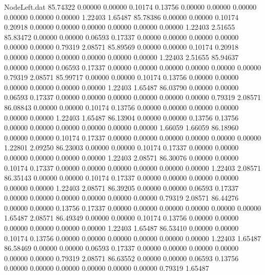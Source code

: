\begin{filecontents}{NodeLeft.dat}
  85.74322    0.00000    0.00000     0.10174    0.13756    0.00000    0.00000    0.00000    0.00000    0.00000    0.00000    1.22403    1.65487
  85.78386    0.00000    0.00000     0.10174    0.20918    0.00000    0.00000    0.00000    0.00000    0.00000    0.00000    1.22403    2.51655
  85.83472    0.00000    0.00000     0.06593    0.17337    0.00000    0.00000    0.00000    0.00000    0.00000    0.00000    0.79319    2.08571
  85.89569    0.00000    0.00000     0.10174    0.20918    0.00000    0.00000    0.00000    0.00000    0.00000    0.00000    1.22403    2.51655
  85.94637    0.00000    0.00000     0.06593    0.17337    0.00000    0.00000    0.00000    0.00000    0.00000    0.00000    0.79319    2.08571
  85.99717    0.00000    0.00000     0.10174    0.13756    0.00000    0.00000    0.00000    0.00000    0.00000    0.00000    1.22403    1.65487
  86.03790    0.00000    0.00000     0.06593    0.17337    0.00000    0.00000    0.00000    0.00000    0.00000    0.00000    0.79319    2.08571
  86.08843    0.00000    0.00000     0.10174    0.13756    0.00000    0.00000    0.00000    0.00000    0.00000    0.00000    1.22403    1.65487
  86.13904    0.00000    0.00000     0.13756    0.13756    0.00000    0.00000    0.00000    0.00000    0.00000    0.00000    1.66059    1.66059
  86.18960    0.00000    0.00000     0.10174    0.17337    0.00000    0.00000    0.00000    0.00000    0.00000    0.00000    1.22801    2.09250
  86.23003    0.00000    0.00000     0.10174    0.17337    0.00000    0.00000    0.00000    0.00000    0.00000    0.00000    1.22403    2.08571
  86.30076    0.00000    0.00000     0.10174    0.17337    0.00000    0.00000    0.00000    0.00000    0.00000    0.00000    1.22403    2.08571
  86.35143    0.00000    0.00000     0.10174    0.17337    0.00000    0.00000    0.00000    0.00000    0.00000    0.00000    1.22403    2.08571
  86.39205    0.00000    0.00000     0.06593    0.17337    0.00000    0.00000    0.00000    0.00000    0.00000    0.00000    0.79319    2.08571
  86.44276    0.00000    0.00000     0.13756    0.17337    0.00000    0.00000    0.00000    0.00000    0.00000    0.00000    1.65487    2.08571
  86.49349    0.00000    0.00000     0.10174    0.13756    0.00000    0.00000    0.00000    0.00000    0.00000    0.00000    1.22403    1.65487
  86.53410    0.00000    0.00000     0.10174    0.13756    0.00000    0.00000    0.00000    0.00000    0.00000    0.00000    1.22403    1.65487
  86.58469    0.00000    0.00000     0.06593    0.17337    0.00000    0.00000    0.00000    0.00000    0.00000    0.00000    0.79319    2.08571
  86.63552    0.00000    0.00000     0.06593    0.13756    0.00000    0.00000    0.00000    0.00000    0.00000    0.00000    0.79319    1.65487

\end{filecontents}
